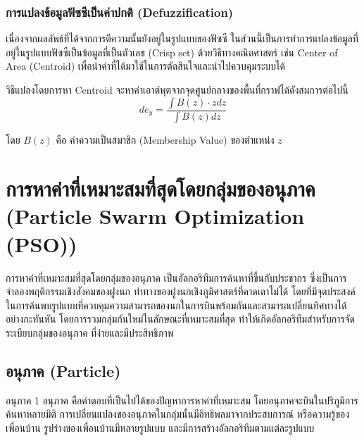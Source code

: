 \subsubsection{การแปลงข้อมูลฟัซซีเป็นค่าปกติ (Defuzzification)}
เนื่องจากผลลัพธ์ที่ได้จากการตีความนั้นยังอยู่ในรูปแบบของฟัซซี ในส่วนนี้เป็นการทำการแปลงข้อมูลที่อยู่ในรูปแบบฟัซซีเป็นข้อมูลที่เป็นตัวเลข (Crisp set) ด้วยวิธีทางคณิตศาสตร์ เช่น Center of Area (Centroid) เพื่อนำค่าที่ได้มาใช้ในการตัดสินใจและนำไปควบคุมระบบได้

วิธีแปลงโดยการหา Centroid จะหาค่าเอาต์พุตจากจุดศูนย์กลางของพื้นที่กราฟได้ดังสมการต่อไปนี้
\begin{equation}
  de_y = \frac{\int B(z)\cdot zdz}{\int B(z)dz}
  \label{eq:centroid}
\end{equation}

โดย \(B(z)\) คือ ค่าความเป็นสมาชิก (Membership Value) ของตำแหน่ง \(z\)

\section{การหาค่าที่เหมาะสมที่สุดโดยกลุ่มของอนุภาค (Particle Swarm Optimization (PSO)) \cite{Sansanee}}
การหาค่าที่เหมาะสมที่สุดโดยกลุ่มของอนุภาค เป็นอัลกอริทึมการค้นหาที่ขึ้นกับประชากร ซึ่งเป็นการจำลองพฤติกรรมเชิงสังคมของฝูงนก ท่าทางของฝูงนกเชิงภูมิศาสตร์ที่คาดเดาไม่ได้ โดยที่มีจุดประสงค์ในการค้นพบรูปแบบที่ควบคุมความสามารถของนกในการบินพร้อมกันและสามารถเปลี่ยนทิศทางได้อย่างกะทันหัน โดยการรวมกลุ่มกันใหม่ในลักษณะที่เหมาะสมที่สุด ทำให้เกิดอัลกอริทึมสำหรับการจัดระเบียบกลุ่มของอนุภาค ที่ง่ายและมีประสิทธิภาพ

\subsection{อนุภาค (Particle)}
อนุภาค 1 อนุภาค คือคำตอบที่เป็นไปได้ของปัญหาการหาค่าที่เหมาะสม โดยอนุภาคจะบินในปริภูมิการค้นหาหลายมิติ การเปลี่ยนแปลงของอนุภาคในกลุ่มนั้นมีอิทธิพลมาจากประสบการณ์ หรือความรู้ของเพื่อนบ้าน รูปร่างของเพื่อนบ้านมีหลายรูปแบบ และมีการสร้างอัลกอริทึมตามแต่ละรูปแบบ

